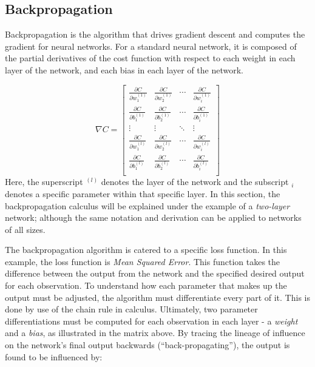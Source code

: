 
\hypertarget{backpropagation}{%
\subsection{Backpropagation}\label{backpropagation}}

Backpropagation is the algorithm that drives gradient descent and computes the gradient for neural networks. For a standard neural network, it is composed of the partial derivatives of the cost function with respect to each weight in each layer of the network, and each bias in each layer of the network.

\[
\nabla{C} =
\begin{bmatrix}
\frac{\partial{C}}{\partial{w_1^{(1)}}} & \frac{\partial{C}}{\partial{w_2^{(1)}}} & \cdots & 
\frac{\partial{C}}{\partial{w_i^{(1)}}} \\
\frac{\partial{C}}{\partial{b_1^{(1)}}} & \frac{\partial{C}}{\partial{b_2^{(1)}}} & \cdots & 
\frac{\partial{C}}{\partial{b_i^{(1)}}} \\
\vdots & \vdots & \ddots & \vdots \\
\frac{\partial{C}}{\partial{w_1^{(l)}}} & \frac{\partial{C}}{\partial{w_2^{(l)}}} & \cdots & 
\frac{\partial{C}}{\partial{w_i^{(l)}}} \\
\frac{\partial{C}}{\partial{b_1^{(l)}}} & \frac{\partial{C}}{\partial{b_2^{(l)}}} & \cdots & 
\frac{\partial{C}}{\partial{b_i^{(l)}}} \\
\end{bmatrix}
\] Here, the superscript \(^{(l)}\) denotes the layer of the network and
the subscript \(_i\) denotes a specific parameter within that specific
layer. In this section, the backpropagation calculus will be explained under the example of a \textit{two-layer} network; although the same notation and derivation can be applied to networks of all sizes.

The backpropagation algorithm is catered to a specific loss function. In
this example, the loss function is \emph{Mean Squared
Error}. This function takes the difference between the output from the
network and the specified desired output for each observation. To
understand how each parameter that makes up the output must be adjusted,
the algorithm must differentiate every part of it. This is done by use
of the chain rule in calculus. Ultimately, two parameter
differentiations must be computed for each observation in each layer - a
\emph{weight} and a \emph{bias}, as illustrated in the matrix above. By tracing the lineage of influence on the
network's final output backwards
(``back-propagating''), the output is found to be influenced by:

